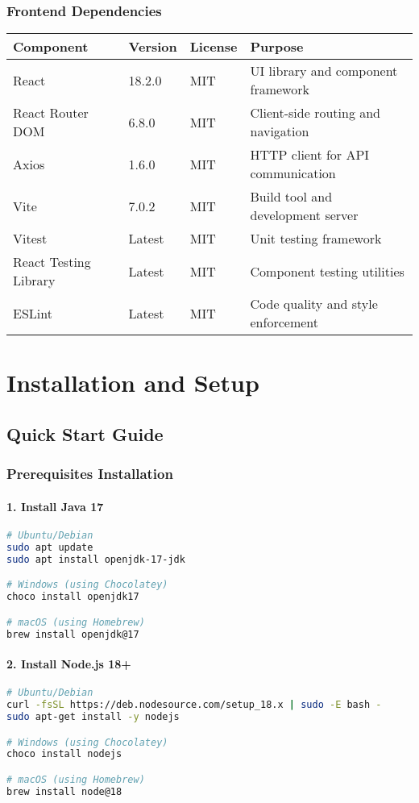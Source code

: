 \documentclass[12pt,a4paper]{article}
\begin{document}
\subsubsection{Frontend Dependencies}
\begin{longtable}{|p{3cm}|p{2cm}|p{2cm}|p{5cm}|}
\hline
\textbf{Component} & \textbf{Version} & \textbf{License} & \textbf{Purpose} \\
\hline
React & 18.2.0 & MIT & UI library and component framework \\
\hline
React Router DOM & 6.8.0 & MIT & Client-side routing and navigation \\
\hline
Axios & 1.6.0 & MIT & HTTP client for API communication \\
\hline
Vite & 7.0.2 & MIT & Build tool and development server \\
\hline
Vitest & Latest & MIT & Unit testing framework \\
\hline
React Testing Library & Latest & MIT & Component testing utilities \\
\hline
ESLint & Latest & MIT & Code quality and style enforcement \\
\hline
\end{longtable}

\section{Installation and Setup}

\subsection{Quick Start Guide}

\subsubsection{Prerequisites Installation}

\paragraph{1. Install Java 17}
\begin{lstlisting}[language=bash]
# Ubuntu/Debian
sudo apt update
sudo apt install openjdk-17-jdk

# Windows (using Chocolatey)
choco install openjdk17

# macOS (using Homebrew)
brew install openjdk@17
\end{lstlisting}

\paragraph{2. Install Node.js 18+}
\begin{lstlisting}[language=bash]
# Ubuntu/Debian
curl -fsSL https://deb.nodesource.com/setup_18.x | sudo -E bash -
sudo apt-get install -y nodejs

# Windows (using Chocolatey)
choco install nodejs

# macOS (using Homebrew)
brew install node@18
\end{lstlisting}
\end{document}
